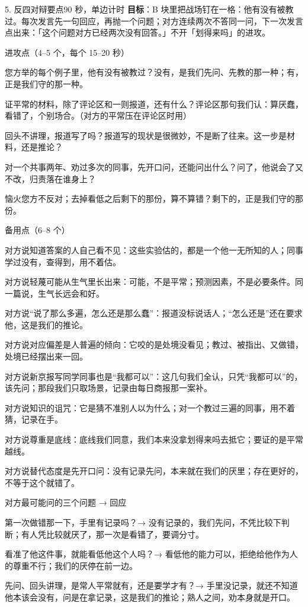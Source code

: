 \documentclass[script,con]{debate}
\begin{document}
\begin{stage}{5. 反四对辩要点}{90 秒，单边计时}
\textbf{目标}：B 块里把战场钉在一格：他有没有被教过。每次发言先一句回应，再抛一个问题；对方连续两次不答同一问，下一次发言点出来：「这个问题对方已经两次没有回答。」不开「划得来吗」的进攻。
\begin{points}{进攻点（4–5 个，每个 15–20 秒）}
\item 您方举的每个例子里，他有没有被教过？没有，是我们先问、先教的那一种；有，正是我们守的那一种。
\item 证平常的材料，除了评论区和一则报道，还有什么？评论区那句我们认：算厌蠢，看错了，个别场合。（对方的平常压在评论区时用）
\item 回头不讲理，报道写了吗？报道写的现状是很微妙，不是断了往来。这一步是材料，还是推论？
\item 对一个共事两年、劝过多次的同事，先开口问，还能问出什么？问了，他说会了又不改，归责落在谁身上？
\item 恼火您方不反对；去掉看低之后剩下的那份，算不算错？剩下的，正是我们守的那份。
\end{points}
\begin{points}{备用点（6–8 个）}
\item 对方说知道答案的人自己看不见：这些实验估的，都是一个他一无所知的人；同事学过没有，查得到，用不着估。
\item 对方说轻蔑可能从生气里长出来：可能，不是平常；预测因素，不是必要条件。同一篇说，生气长远会和好。
\item 对方说“说了那么多遍，怎么还是那么蠢”：报道没标说话人；“怎么还是”还在要求他，这是我们的推论。
\item 对方说对应偏差是人普遍的倾向：它咬的是处境没看见；教过、被指出、又做错，处境已经摆出来一回。
\item 对方说新京报写同学同事也是“我都可以”：这几句我们全认，只凭“我都可以”的，该先问；那段我们只取场景，记录由每日商报那一案补。
\item 对方说知识的诅咒：它是猜不准别人以为什么；对一个教过三遍的同事，用不着猜，记录在手。
\item 对方说尊重是底线：底线我们同意，我们本来没拿划得来吗去抵它；要证的是平常越线。
\item 对方说替代态度是先开口问：没有记录先问，本来就在我们的厌里；存在更好的，不等于这个就错了。
\end{points}
\begin{points}{对方最可能问的三个问题 → 回应}
\item 第一次做错那一下，手里有记录吗？→ 没有记录的，我们先问，不凭比较下判断；有人凭比较就厌了，那一次是看错了，要调分寸。
\item 看准了他这件事，就能看低他这个人吗？→ 看低他的能力可以，拒绝给他作为人的尊重不行；我们的厌停在前一边。
\item 先问、回头讲理，是常人平常就有，还是要学才有？→ 手里没记录，就还不知道他本该会没有，问是在拿记录，这是我们的推论；熟人之间，劝本身就是开口。
\end{points}
\end{stage}
\end{document}
